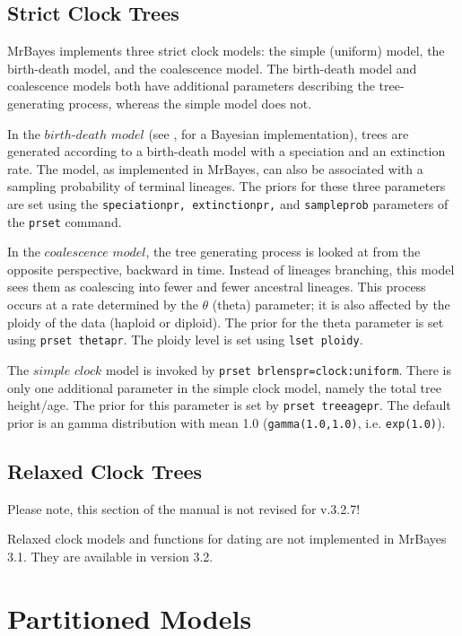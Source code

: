 \documentclass[12pt]{book}
\newcommand{\ttt}[1]{\texttt{#1}}
\begin{document}
\subsection{Strict Clock Trees}

MrBayes implements three strict clock models: the simple (uniform) model, the birth-death model, and
the coalescence model. The birth-death model and coalescence models both have additional parameters
describing the tree-generating process, whereas the simple model does not.

In the $birth$-$death$ $model$ (see \citet{yang97b}, for a Bayesian implementation), trees are
generated according to a birth-death model with a speciation and an extinction rate. The model, as
implemented in MrBayes, can also be associated with a sampling probability of terminal lineages.
The priors for these three parameters are set using the \ttt{speciationpr, extinctionpr,} and
\ttt{sampleprob} parameters of the \ttt{prset} command.

In the $coalescence$ $model$, the tree generating process is looked at from the opposite
perspective, backward in time. Instead of lineages branching, this model sees them as coalescing
into fewer and fewer ancestral lineages. This process occurs at a rate determined by the $\theta$
(theta) parameter; it is also affected by the ploidy of the data (haploid or diploid). The prior
for the theta parameter is set using \ttt{prset thetapr}. The ploidy level is set using \ttt{lset
ploidy}.

The $simple$ $clock$ model is invoked by \ttt{prset brlenspr=clock:uniform}. There is only one
additional parameter in the simple clock model, namely the total tree height/age. The prior for this
parameter is set by \ttt{prset treeagepr}. The default prior is an gamma distribution with
mean 1.0 (\ttt{gamma(1.0,1.0)}, i.e. \ttt{exp(1.0)}).

\subsection{Relaxed Clock Trees}
{\large\color{red} Please note, this section of the manual is not revised for v.3.2.7!}

Relaxed clock models and functions for dating are not implemented in MrBayes 3.1. They are
available in version 3.2.

\section{Partitioned Models}
\label{partitionedModels}
\end{document}

